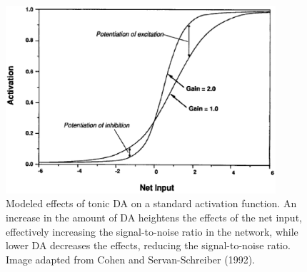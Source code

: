 
\begin{figure}[tp]
\begin{center}
	\includegraphics[width=100mm]{figures/gain_manipulation.eps}
\end{center}
\caption{Modeled effects of tonic DA on a standard activation function. An increase in the amount of DA heightens the effects of the net input, effectively increasing the signal-to-noise ratio in the network, while lower DA decreases the effects, reducing the signal-to-noise ratio. Image adapted from Cohen and Servan-Schreiber (1992).}
\label{gain-manipulation}
\end{figure} 

